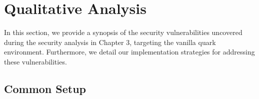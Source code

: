 \section{Qualitative Analysis}
In this section, we provide a synopsis of the security vulnerabilities uncovered during the security analysis in Chapter 3, targeting the vanilla quark environment. Furthermore, we detail our implementation strategies for addressing these vulnerabilities.

\subsection{Common Setup}



